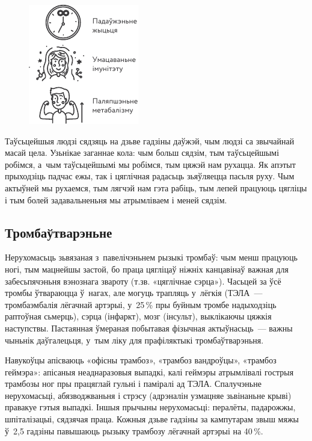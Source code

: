 \begin{figure}[htb!]
  \centering
  \includegraphics[scale=1.5]{willpower/ch5/4.pdf}
\end{figure}

Таўсьцейшыя людзі сядзяць на дзьве гадзіны даўжэй, чым людзі са звычайнай масай цела. Узьнікае заганнае кола: чым больш сядзім, тым таўсьцейшымі робімся, а~чым таўсьцейшымі мы робімся, тым цяжэй нам рухацца. Як апэтыт прыходзіць падчас ежы, так і цяглічная радасьць зьяўляецца пасьля руху. Чым актыўней мы рухаемся, тым лягчэй нам гэта рабіць, тым лепей працуюць цягліцы і тым болей задавальненьня мы атрымліваем і меней сядзім.

\subsection*{Тромбаўтварэньне}

Нерухомасьць зьвязаная з~павелічэньнем рызыкі тромбаў: чым менш працуюць ногі, тым мацнейшы застой, бо праца цягліцаў ніжніх канцавінаў важная для забесьпячэньня вэнознага звароту (т.зв. «цяглічнае сэрца»). Часьцей за ўсё тромбы ўтвараюцца ў~нагах, але могуць трапляць у~лёгкія (ТЭЛА~--- тромбаэмбалія лёгачнай артэрыі, у~25\,\% пры буйным тромбе надыходзіць раптоўная сьмерць), сэрца (інфаркт), мозг (інсульт), выклікаючы цяжкія наступствы. Пастаянная ўмераная побытавая фізычная актыўнасьць~--- важны чыньнік даўгалецьця, у~тым ліку для прафіляктыкі тромбаўтварэньня.

Навукоўцы апісваюць «офісны трамбоз», «трамбоз вандроўцы», «трамбоз геймэра»: апісаныя неаднаразовыя выпадкі, калі геймэры атрымлівалі гострыя трамбозы ног пры працяглай гульні і паміралі ад ТЭЛА. Спалучэньне нерухомасьці, абязводжваньня і стрэсу (адрэналін узмацняе зьвінаньне крыві) правакуе гэтыя выпадкі. Іншыя прычыны нерухомасьці: пералёты, падарожжы, шпіталізацыі, сядзячая праца. Кожныя дзьве гадзіны за кампутарам звыш мяжы ў~2,5 гадзіны павышаюць рызыку трамбозу лёгачнай артэрыі на 40\,\%.

